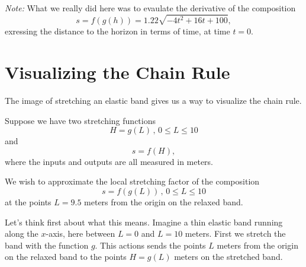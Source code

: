 \documentclass{ximera}
\begin{document}
\begin{example}
\begin{explanation}
\emph{Note:} What we really did here was to evaulate the derivative of the composition
\[
      s = f(g(h)) = 1.22\sqrt{-4t^2 + 16t + 100},
\]
exressing the distance to the horizon in terms of time, at time $t=0$.
\end{explanation}



\end{example}






\section{Visualizing the Chain Rule}

The image of stretching an elastic band gives us a way to visualize the chain rule.

Suppose we have two stretching functions
\[
     H = g(L) \, , \, 0\leq L \leq 10
\]
and
\[
     s = f(H),
\]
where the inputs and outputs are all measured in meters. 

We wish to approximate the local stretching factor of the composition 
\[
      s = f(g(L)) \, , \, 0\leq L \leq 10 
\]
at the points $L=9.5$ meters from the origin on the relaxed band.

Let's think first about what this means. Imagine a thin elastic band running along the $x$-axis, here between $L=0$ and $L=10$ meters. First we stretch the band with the function $g$. This actions sends the points $L$ meters from the origin on the relaxed band to the points $H=g(L)$ meters on the stretched band.
\end{document}
